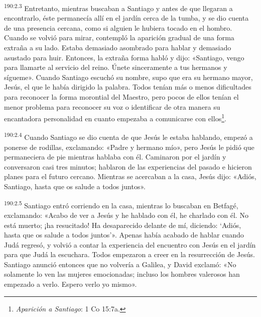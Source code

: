 \par 
\textsuperscript{190:2.3} Entretanto, mientras buscaban a Santiago y antes de que llegaran a encontrarlo, éste permanecía allí en el jardín cerca de la tumba, y se dio cuenta de una presencia cercana, como si alguien le hubiera tocado en el hombro. Cuando se volvió para mirar, contempló la aparición gradual de una forma extraña a su lado. Estaba demasiado asombrado para hablar y demasiado asustado para huir. Entonces, la extraña forma habló y dijo: «Santiago, vengo para llamarte al servicio del reino. Únete sinceramente a tus hermanos y sígueme». Cuando Santiago escuchó su nombre, supo que era su hermano mayor, Jesús, el que le había dirigido la palabra. Todos tenían más o menos dificultades para reconocer la forma morontial del Maestro, pero pocos de ellos tenían el menor problema para reconocer su voz o identificar de otra manera su encantadora personalidad en cuanto empezaba a comunicarse con ellos\footnote{\textit{Aparición a Santiago}: 1 Co 15:7a.}.

\par 
\textsuperscript{190:2.4} Cuando Santiago se dio cuenta de que Jesús le estaba hablando, empezó a ponerse de rodillas, exclamando: «Padre y hermano mío», pero Jesús le pidió que permaneciera de pie mientras hablaba con él. Caminaron por el jardín y conversaron casi tres minutos; hablaron de las experiencias del pasado e hicieron planes para el futuro cercano. Mientras se acercaban a la casa, Jesús dijo: «Adiós, Santiago, hasta que os salude a todos juntos».

\par 
\textsuperscript{190:2.5} Santiago entró corriendo en la casa, mientras lo buscaban en Betfagé, exclamando: «Acabo de ver a Jesús y he hablado con él, he charlado con él. No está muerto; ¡ha resucitado! Ha desaparecido delante de mí, diciendo: `Adiós, hasta que os salude a todos juntos'». Apenas había acabado de hablar cuando Judá regresó, y volvió a contar la experiencia del encuentro con Jesús en el jardín para que Judá la escuchara. Todos empezaron a creer en la resurrección de Jesús. Santiago anunció entonces que no volvería a Galilea, y David exclamó: «No solamente lo ven las mujeres emocionadas; incluso los hombres valerosos han empezado a verlo. Espero verlo yo mismo».

